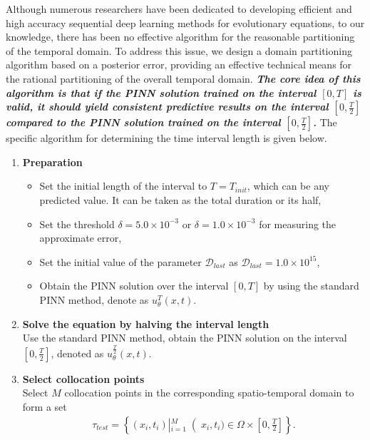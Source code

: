 \documentclass[preprint]{elsarticle}
\numberwithin{table}{section}
\numberwithin{equation}{section}
\numberwithin{figure}{section}
\begin{document}
\begin{CJK}{UTF8}{gbsn}
Although numerous researchers have been dedicated to developing efficient and high accuracy sequential deep learning methods for evolutionary equations,  {to our knowledge}, there has been no effective algorithm   for the reasonable   partitioning of the temporal domain. To address this issue, we  design a domain partitioning  algorithm based on a posterior error, providing an effective technical means for the rational partitioning of the overall temporal domain. \textbf{\textit{The core idea of this algorithm is that if the PINN solution trained on the interval $[0,T]$ is valid, it should yield consistent predictive results on the interval $[0,\frac{T}{2}]$ compared to the PINN solution trained on the interval $[0,\frac{T}{2}]$.}}
The specific algorithm   for determining  the time interval length is given below.
\begin{enumerate}
    \item 
\textbf{Preparation}
\begin{itemize}
    \item 
    Set the initial length of the interval to 
$T=T_{init}$, which can be any predicted value. It can be taken as the total duration or its half,
    \item 
     Set the threshold $\delta=5.0\times10^{-3}$ or $\delta=1.0\times10^{-3}$ for measuring the approximate error,
    \item
    Set the initial value of the parameter $\mathcal{D}_{last}$ as 
    $\mathcal{D}_{last}=1.0\times10^{15}$,
    \item 
    Obtain the PINN solution over the interval $[0,T]$ by using the standard PINN method, denote as 
   $u_\theta^{T}(x,t)$.
\end{itemize}

\item 
\textbf{Solve the equation by halving the interval length
 }\\
    Use the standard PINN method, obtain the PINN solution on the interval $[0,\frac{T}{2}]$, denoted as $u_\theta^{\frac{T}{2}}(x,t)$.

\item 
\textbf{Select collocation points}\\
Select $M$ collocation points in the corresponding spatio-temporal domain to form a set  
\begin{align*}
\tau_{test} = \left\{ \left( x_i, t_i \right) \left|_{i=1}^{M}\right  (x_i, t_i) \in \Omega \times \left[0,\frac{T}{2}\right] \right\}.
\end{align*}


\end{enumerate}
\end{CJK}
\end{document}
